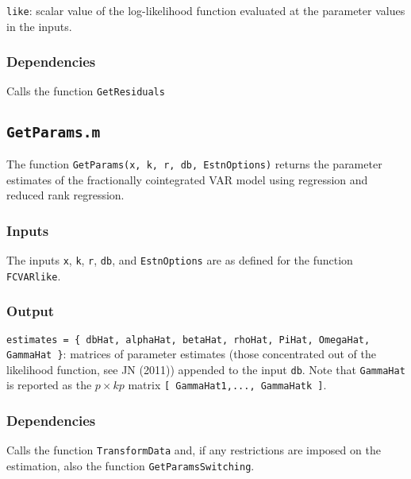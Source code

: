 \documentclass[12pt]{article}
\begin{document}
\texttt{like}: scalar value of the log-likelihood function evaluated at the parameter values in the inputs.


\subsubsection*{Dependencies}

Calls the function \texttt{GetResiduals}







\newpage


\subsection{\texttt{GetParams.m}}

The function \texttt{GetParams(x, k, r, db, EstnOptions)} returns the parameter estimates of the fractionally cointegrated VAR model using regression and reduced rank regression.


\subsubsection*{Inputs}

The inputs \texttt{x}, \texttt{k}, \texttt{r}, \texttt{db}, and \texttt{EstnOptions} are as defined for the function \texttt{FCVARlike}.


\subsubsection*{Output}

\texttt{estimates = \{ dbHat, alphaHat, betaHat, rhoHat, PiHat, OmegaHat, GammaHat \}}: matrices of parameter estimates (those concentrated out of the likelihood function, see JN (2011)) appended to the input \texttt{db}. Note that \texttt{GammaHat} is reported as the $p \times kp$ matrix \texttt{[ GammaHat1,..., GammaHatk ]}.


\subsubsection*{Dependencies}

Calls the function \texttt{TransformData} and, if any restrictions are imposed on the estimation, also the function \texttt{GetParamsSwitching}.




\newpage
\end{document}
